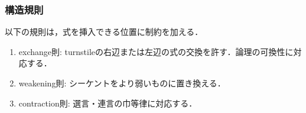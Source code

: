 \documentclass[a4paper,10pt,platex, dvipdfmx]{jsarticle}
\begin{document}
\subsubsection{構造規則}
以下の規則は，式を挿入できる位置に制約を加える．
\begin{enumerate}
\item exchange則: turnstileの右辺または左辺の式の交換を許す．論理の可換性に対応する．
\begin{figure}[H]
    \begin{minipage}[b]{0.45\linewidth}
        \begin{prooftree}
            \end{prooftree}
    \end{minipage}
    \begin{minipage}[b]{0.45\linewidth}
        \begin{prooftree}
            \end{prooftree}
    \end{minipage}
\end{figure}
\item weakening則: シーケントをより弱いものに置き換える．\begin{figure}[H]
\begin{minipage}[b]{0.45\columnwidth}
    \begin{prooftree}
    \end{prooftree}
\end{minipage}
\begin{minipage}[b]{0.45\columnwidth}
    \begin{prooftree}
    \end{prooftree}
\end{minipage}
\begin{minipage}[b]{0.45\columnwidth}
\end{minipage}
\end{figure}
\item contraction則: 選言・連言の巾等律に対応する．

\end{enumerate}
\end{document}
